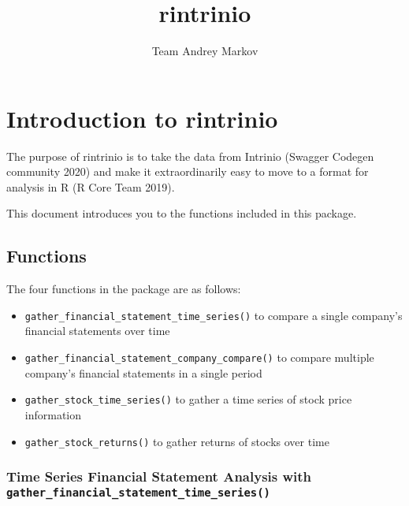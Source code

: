 \documentclass[
]{article}
\title{rintrinio}
\author{Team Andrey Markov}
\date{}
\providecommand{\tightlist}{%
  \setlength{\itemsep}{0pt}\setlength{\parskip}{0pt}}
\begin{document}
\maketitle

\hypertarget{introduction-to-rintrinio}{%
\section{Introduction to rintrinio}\label{introduction-to-rintrinio}}

The purpose of rintrinio is to take the data from Intrinio (Swagger
Codegen community 2020) and make it extraordinarily easy to move to a
format for analysis in R (R Core Team 2019).

This document introduces you to the functions included in this package.

\hypertarget{functions}{%
\subsection{Functions}\label{functions}}

The four functions in the package are as follows:

\begin{itemize}
\tightlist
\item
  \texttt{gather\_financial\_statement\_time\_series()} to compare a
  single company's financial statements over time
\item
  \texttt{gather\_financial\_statement\_company\_compare()} to compare
  multiple company's financial statements in a single period
\item
  \texttt{gather\_stock\_time\_series()} to gather a time series of
  stock price information
\item
  \texttt{gather\_stock\_returns()} to gather returns of stocks over
  time
\end{itemize}

\hypertarget{time-series-financial-statement-analysis-with-gather_financial_statement_time_series}{%
\subsubsection{\texorpdfstring{Time Series Financial Statement Analysis
with
\texttt{gather\_financial\_statement\_time\_series()}}{Time Series Financial Statement Analysis with gather\_financial\_statement\_time\_series()}}\label{time-series-financial-statement-analysis-with-gather_financial_statement_time_series}}
\end{document}
